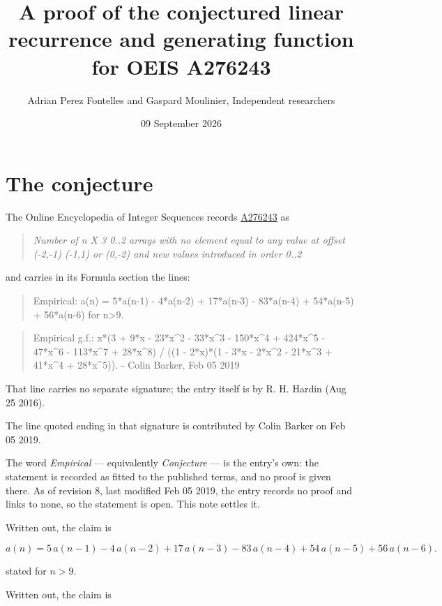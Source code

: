\documentclass[11pt]{article}
\title{A proof of the conjectured linear recurrence and generating function for OEIS A276243}
\author{Adrian Perez Fontelles and Gaspard Moulinier, Independent researchers}
\date{09 September 2026}
\theoremstyle{definition}
\begin{document}
\maketitle
\section{The conjecture}

The Online Encyclopedia of Integer Sequences records \href{https://oeis.org/A276243}{A276243} as

\begin{quote}\itshape Number of n X 3 0..2 arrays with no element equal to any value at offset (-2,-1) (-1,1) or (0,-2) and new values introduced in order 0..2\end{quote}

and carries in its Formula section the lines:

\begin{quote}\ttfamily Empirical: a(n) = 5*a(n-1) - 4*a(n-2) + 17*a(n-3) - 83*a(n-4) + 54*a(n-5) + 56*a(n-6) for n>9.\end{quote}

\begin{quote}\ttfamily Empirical g.f.: x*(3 + 9*x - 23*x\textasciicircum{}2 - 33*x\textasciicircum{}3 - 150*x\textasciicircum{}4 + 424*x\textasciicircum{}5 - 47*x\textasciicircum{}6 - 113*x\textasciicircum{}7 + 28*x\textasciicircum{}8) / ((1 - 2*x)*(1 - 3*x - 2*x\textasciicircum{}2 - 21*x\textasciicircum{}3 + 41*x\textasciicircum{}4 + 28*x\textasciicircum{}5)). - Colin Barker, Feb 05 2019\end{quote}

That line carries no separate signature; the entry itself is by R. H. Hardin (Aug 25 2016).

The line quoted ending in that signature is contributed by Colin Barker on Feb 05 2019.

The word {\itshape Empirical} --- equivalently {\itshape Conjecture} --- is the entry's own: the statement is recorded as fitted to the published terms, and no proof is given there. As of revision 8, last modified Feb 05 2019, the entry records no proof and links to none, so the statement is open. This note settles it.

Written out, the claim is

\[a(n) = 5\,a(n-1) - 4\,a(n-2) + 17\,a(n-3) - 83\,a(n-4) + 54\,a(n-5) + 56\,a(n-6).\]

stated for $n > 9$.

Written out, the claim is
\end{document}
